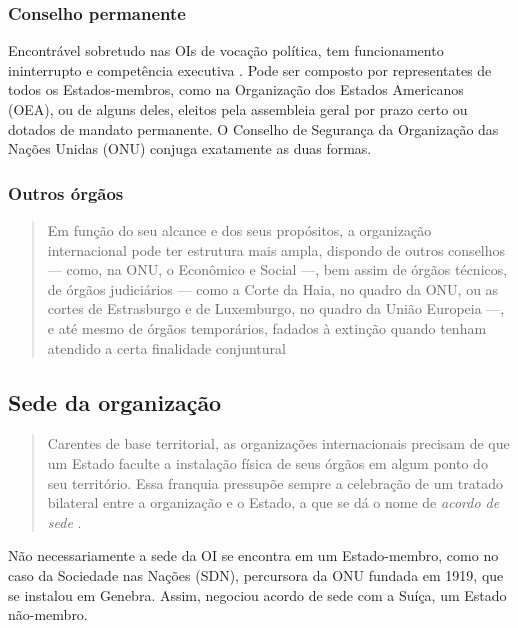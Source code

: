 \documentclass{article}
\begin{document}
\subsubsection{Conselho permanente}

Encontrável sobretudo nas OIs de vocação política, tem funcionamento ininterrupto e competência executiva \cite{rezek_direito_2024}. Pode ser composto por representates de todos os Estados-membros, como na Organização dos Estados Americanos (OEA), ou de alguns deles, eleitos pela assembleia geral por prazo certo ou dotados de mandato permanente. O Conselho de Segurança da Organização das Nações Unidas (ONU) conjuga exatamente as duas formas.

\subsubsection{Outros órgãos}

\begin{quote}
    Em função do seu alcance e dos seus propósitos, a organização internacional pode ter estrutura mais ampla, dispondo de outros conselhos — como, na ONU, o Econômico e Social —, bem assim de órgãos técnicos, de órgãos judiciários — como a Corte da Haia, no quadro da ONU, ou as cortes de Estrasburgo e de Luxemburgo, no quadro da União Europeia —, e até mesmo de órgãos temporários, fadados à extinção quando tenham atendido a certa finalidade conjuntural \cite[p. 108]{rezek_direito_2024}
\end{quote}

\subsection{Sede da organização}

\begin{quote}
    Carentes de base territorial, as organizações internacionais precisam de que um Estado faculte a instalação física de seus órgãos em algum ponto do seu território. Essa franquia pressupõe sempre a celebração de um tratado bilateral entre a organização e o Estado, a que se dá o nome de \textit{acordo de sede} \cite[p. 110]{rezek_direito_2024}.
\end{quote}

Não necessariamente a sede da OI se encontra em um Estado-membro, como no caso da Sociedade nas Nações (SDN), percursora da ONU fundada em 1919, que se instalou em Genebra. Assim, negociou acordo de sede com a Suíça, um Estado não-membro.
\end{document}
